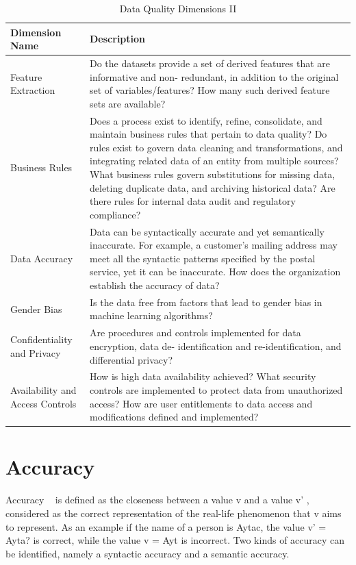 \begin{table}
\caption{Data Quality Dimensions II}
\centering
\begin{tabular}{p{4.0cm} p{10cm}}
\toprule
\textbf{Dimension Name} & \textbf{Description} \\ 
\bottomrule
Feature Extraction & 
Do the datasets provide a set of derived features that are informative and non-
redundant, in addition to the original set of variables/features? How many such
derived feature sets are available? 
\\
Business Rules & 
Does a process exist to identify, refine, consolidate, and maintain business
rules that pertain to data quality? Do rules exist to govern data cleaning and
transformations, and integrating related data of an entity from multiple sources?
What business rules govern substitutions for missing data, deleting duplicate data,
and archiving historical data? Are there rules for internal data audit and regulatory
compliance? \\
Data Accuracy & 
Data can be syntactically accurate and yet semantically inaccurate. For example,
a customer's mailing address may meet all the syntactic patterns specified by the
postal service, yet it can be inaccurate. How does the organization establish the
accuracy of data? \\
Gender Bias & 
Is the data free from factors that lead to gender bias in machine learning
algorithms? \\
Confidentiality and Privacy & 
Are procedures and controls implemented for data encryption, data de-
identification and re-identification, and differential privacy? \\
Availability and Access Controls & 
How is high data availability achieved? What security controls are implemented to
protect data from unauthorized access? How are user entitlements to data access
and modifications defined and implemented? \\
\bottomrule
\end{tabular}
\end{table}


\section{Accuracy}

Accuracy ~\citep{Falorsi} is defined as the closeness between a value v and a value v' , considered as 
the correct representation of the real-life phenomenon that v aims to
represent. As an example if the name of a person is Aytac, the value v' = Ayta?
is correct, while the value v = Ayt is incorrect. Two kinds of accuracy can be
identified, namely a syntactic accuracy and a semantic accuracy.

